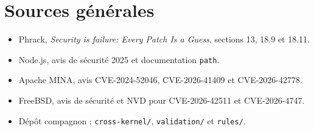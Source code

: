 \documentclass{training}
\begin{document}
\chapter{Sources générales}
\begin{itemize}
  \item Phrack, \emph{Security is failure: Every Patch Is a Guess},
        sections 13, 18.9 et 18.11.
  \item Node.js, avis de sécurité 2025 et documentation \texttt{path}.
  \item Apache MINA, avis CVE-2024-52046, CVE-2026-41409 et
        CVE-2026-42778.
  \item FreeBSD, avis de sécurité et NVD pour CVE-2026-42511 et
        CVE-2026-4747.
  \item Dépôt compagnon : \texttt{cross-kernel/}, \texttt{validation/} et
        \texttt{rules/}.
\end{itemize}

\end{document}
